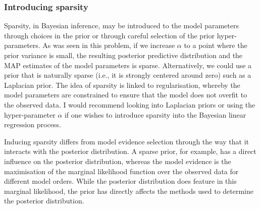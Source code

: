 \documentclass{article}
\begin{document}
\subsubsection{Introducing sparsity}
Sparsity, in Bayesian inference, may be introduced to the model parameters through choices in the prior or through careful selection of the prior hyper-parameters. As was seen in this problem, if we increase $\alpha$ to a point where the prior variance is small, the resulting posterior predictive distribution and the MAP estimates of the model parameters is sparse. Alternatively, we could use a prior that is naturally sparse (i.e., it is strongly centered around zero) such as a Laplacian prior. The idea of sparsity is linked to regularisation, whereby the model parameters are constrained to ensure that the model does not overfit to the observed data. I would recommend looking into Laplacian priors or using the hyper-parameter $\alpha$ if one wishes to introduce sparsity into the Bayesian linear regression process.

Inducing sparsity differs from model evidence selection through the way that it interacts with the posterior distribution. A sparse prior, for example, has a direct influence on the posterior distribution, whereas the model evidence is the maximisation of the marginal likelihood function over the observed data for different model orders. While the posterior distribution does feature in this marginal likelihood, the prior has directly affects the methods used to determine the posterior distribution. 

\clearpage

\clearpage

\printbibliography
\end{document}

